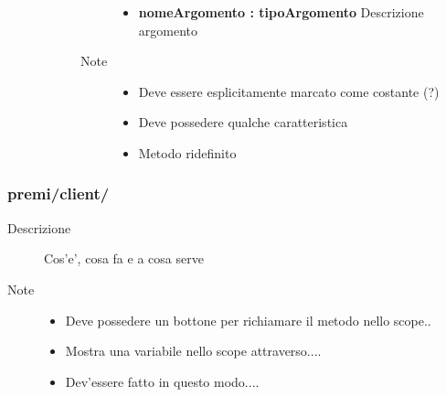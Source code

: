 \begin{description}
\begin{description}
\begin{description}
\begin{itemize}
					\item \textbf{nomeArgomento : tipoArgomento			} \hfill
					Descrizione argomento
					
				\end{itemize}
			\item[Note] \hfill
			\begin{itemize}
					\item Deve essere esplicitamente marcato come costante (?)
					\item Deve possedere qualche caratteristica
					\item Metodo ridefinito
			\end{itemize}
		\end{description}
	\end{description}

\end{description}






\subsubsection{premi/client/}

\begin{description}
\item[Descrizione] \hfill
	Cos'e', cosa fa e a cosa serve
\item[Note] \hfill
	\begin{itemize}
			\item Deve possedere un bottone per richiamare il metodo nello scope..
			\item Mostra una variabile nello scope attraverso....
			\item Dev'essere fatto in questo modo....
	\end{itemize}
\end{description}